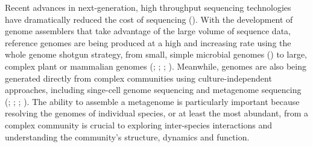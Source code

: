 \documentclass[phd,tocprelim]{cornell}
\begin{document}
Recent advances in next-generation, high throughput sequencing technologies have dramatically reduced the cost of sequencing (\cite{Metzker2010}).  With the development of genome assemblers that take advantage of the large volume of sequence data, reference genomes are being produced at a high and increasing rate using the whole genome shotgun strategy, from small, simple microbial genomes (\cite{Wu2009}) to large, complex plant or mammalian genomes (\cite{Fujimoto2010};  \cite{Li2010}; \cite{Schmutz2010}; \cite{Zimin2008}). Meanwhile, genomes are also being generated directly from complex communities using culture-independent approaches, including singe-cell genome sequencing and metagenome sequencing (\cite{Woyke2010}; \cite{Yilmaz2011}; \cite{Hess2011}; \cite{Iverson2012}). The ability to assemble a metagenome is particularly important because resolving the genomes of individual species, or at least the most abundant, from a complex community is crucial to exploring inter-species interactions and understanding the community’s structure, dynamics and function.
\end{document}
